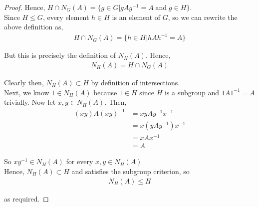 \documentclass[11pt, reqno]{amsart}
\theoremstyle{plain}
\theoremstyle{definition}
\theoremstyle{example}
\begin{document}
\begin{enumerate}[1.]
\begin{enumerate}
\begin{proof}
Hence, $H \cap N_G(A) = \{g \in G | gAg^{-1} = A \; \text{and} \; g \in H\}$.\\

Since $H \leqslant G$, every element $h \in H$ is an element of $G$, so we can rewrite the above definition as,
\begin{align*}
H \cap N_G(A) = \{h \in H | hAh^{-1} = A\}
\end{align*}

But this is precisely the definition of $N_H(A)$. Hence,
\begin{align*}
N_H(A) = H \cap N_G(A)
\end{align*}

Clearly then, $N_H(A) \subset H$ by definition of intersections.\\

Next, we know $1 \in N_H(A)$ because $1 \in H$ since $H$ is a subgroup and $1A1^{-1} = A$ trivially. Now let $x, y \in N_H(A)$. Then,
\begin{align*}
(xy)A(xy)^{-1} &= xyAy^{-1}x^{-1}\\
&= x(yAy^{-1})x^{-1}\\
&= xAx^{-1}\\
&= A
\end{align*}

So $xy^{-1} \in N_H(A)$ for every $x, y \in N_H(A)$\\

Hence, $N_H(A) \subset H$ and satisfies the subgroup criterion, so
\begin{align*}
N_H(A) \leqslant H
\end{align*}

as required.
\end{proof}
\end{enumerate}

\end{enumerate}
\end{document}
